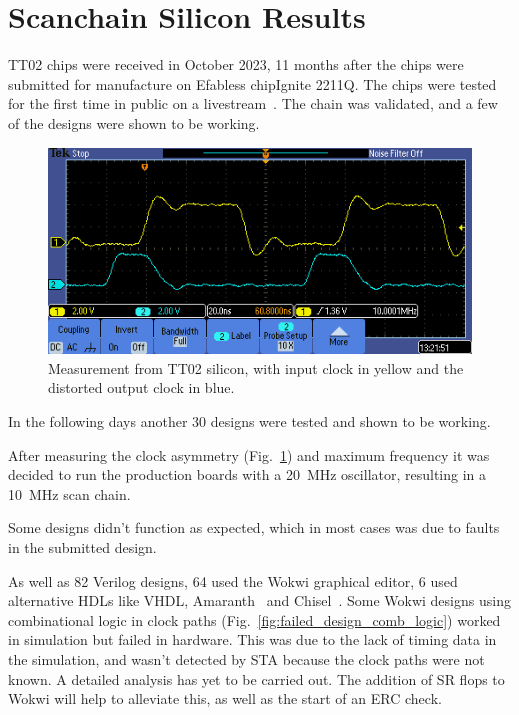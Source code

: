 \section{Scanchain Silicon Results}
\label{sec:scan_chain_res}

TT02 chips were received in October 2023, 11 months after the chips were submitted for manufacture on Efabless chipIgnite 2211Q.
The chips were tested for the first time in public on a livestream~\cite{siliconalive}.
The chain was validated, and a few of the designs were shown to be working.

\begin{figure}[!t]
\centering
\includegraphics[width=\columnwidth]{./Figs/tt02_clock_out.png}
\caption{Measurement from TT02 silicon, with input clock in yellow and the distorted output clock in blue.}
\label{fig:TT02_clock_out}
\end{figure}

In the following days another 30 designs were tested and shown to be working.

After measuring the clock asymmetry (Fig.~\ref{fig:TT02_clock_out}) and maximum frequency it was decided to run the production boards with a \qty{20}{\MHz} oscillator, resulting in a \qty{10}{\MHz} scan chain.

Some designs didn’t function as expected, which in most cases was due to faults in the submitted design.

As well as 82 Verilog designs, 64 used the Wokwi graphical editor, 6 used alternative HDLs like VHDL, Amaranth~\cite{amaranth} and Chisel~\cite{chisel}.
Some Wokwi designs using combinational logic in clock paths (Fig.~\ref{fig:failed_design_comb_logic}) worked in simulation but failed in hardware.
This was due to the lack of timing data in the simulation, and wasn’t detected by STA because the clock paths were not known.
A detailed analysis has yet to be carried out.
The addition of SR flops to Wokwi will help to alleviate this, as well as the start of an ERC check.

